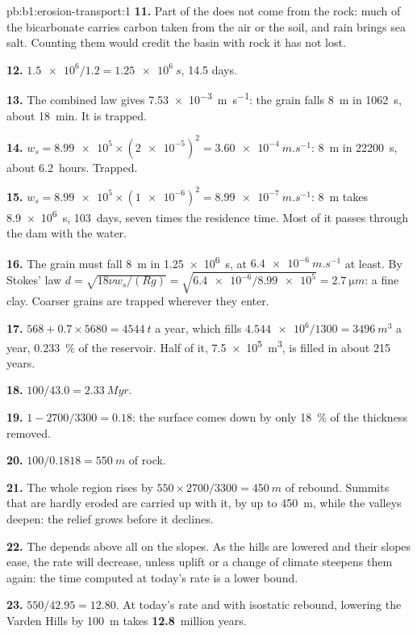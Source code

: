 \begin{solution}{pb:b1:erosion-transport:1}
\textbf{11.} Part of the  does not come from the rock: much of the
bicarbonate carries carbon taken from the air or the soil, and rain brings sea
salt. Counting them would credit the basin with rock it has not lost.

\textbf{12.} $\num{1.5e6}/1.2 = \qty{1.25e6}{s}$, \num{14.5} days.

\textbf{13.} The combined law gives \qty{7.53e-3}{m.s^{-1}}: the grain falls
\qty{8}{m} in \qty{1062}{s}, about \qty{18}{min}. It is trapped.

\textbf{14.} $w_s = \num{8.99e5} \times (\num{2e-5})^2 =
\qty{3.60e-4}{m.s^{-1}}$: \qty{8}{m} in \qty{22200}{s}, about \num{6.2}~hours.
Trapped.

\textbf{15.} $w_s = \num{8.99e5} \times (\num{1e-6})^2 =
\qty{8.99e-7}{m.s^{-1}}$: \qty{8}{m} takes \qty{8.9e6}{s}, \num{103}~days, seven
times the residence time. Most of it passes through the dam with the water.

\textbf{16.} The grain must fall \qty{8}{m} in \qty{1.25e6}{s}, at
$\qty{6.4e-6}{m.s^{-1}}$ at least. By Stokes' law $d = \sqrt{18\nu
w_s/(Rg)} = \sqrt{\num{6.4e-6}/\num{8.99e5}} = \qty{2.7}{\micro m}$: a fine
clay. Coarser grains are trapped wherever they enter.

\textbf{17.} $568 + 0.7 \times 5680 = \qty{4544}{t}$ a year, which fills
$\num{4.544e6}/1300 = \qty{3496}{m^3}$ a year, \qty{0.233}{\percent} of the
reservoir. Half of it, \qty{7.5e5}{m^3}, is filled in about \num{215} years.

\textbf{18.} $100/43.0 = \qty{2.33}{Myr}$.

\textbf{19.} $1 - 2700/3300 = 0.18$: the surface comes down by only
\qty{18}{\percent} of the thickness removed.

\textbf{20.} $100/0.1818 = \qty{550}{m}$ of rock.

\textbf{21.} The whole region rises by $550 \times 2700/3300 = \qty{450}{m}$
of rebound. Summits that are hardly eroded are carried up with it, by up to
\qty{450}{m}, while the valleys deepen: the relief grows before it declines.

\textbf{22.} The  depends above all on the slopes. As the hills
are lowered and their slopes ease, the rate will decrease, unless uplift or a
change of climate steepens them again: the time computed at today's rate is a
lower bound.

\textbf{23.} $550/42.95 = 12.80$. At today's rate and with isostatic rebound,
lowering the Varden Hills by \qty{100}{m} takes \textbf{12.8}~million years.
\end{solution}
